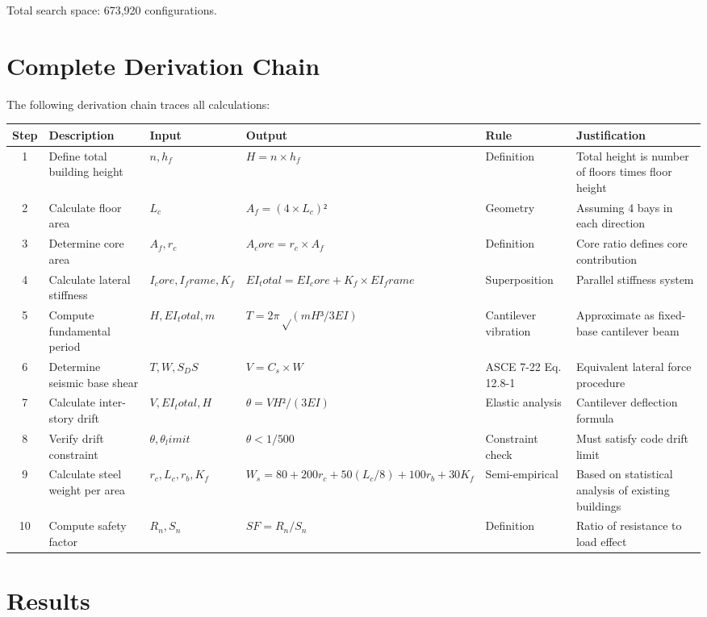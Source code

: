 \documentclass[11pt,a4paper]{article}
\begin{document}
Total search space: 673,920 configurations.

\section{Complete Derivation Chain}

The following derivation chain traces all calculations:

\begin{longtable}{|c|p{3cm}|p{2.5cm}|p{3cm}|p{2cm}|p{3cm}|}
\hline
Step & Description & Input & Output & Rule & Justification \\
\hline\endhead
1 & Define total building height & $n, h_f$ & $H = n × h_f$ & Definition & Total height is number of floors times floor height \\
\hline
2 & Calculate floor area & $L_c$ & $A_f = (4 × L_c)²$ & Geometry & Assuming 4 bays in each direction \\
\hline
3 & Determine core area & $A_f, r_c$ & $A_core = r_c × A_f$ & Definition & Core ratio defines core contribution \\
\hline
4 & Calculate lateral stiffness & $I_core, I_frame, K_f$ & $EI_total = EI_core + K_f × EI_frame$ & Superposition & Parallel stiffness system \\
\hline
5 & Compute fundamental period & $H, EI_total, m$ & $T = 2π√(mH³/3EI)$ & Cantilever vibration & Approximate as fixed-base cantilever beam \\
\hline
6 & Determine seismic base shear & $T, W, S_DS$ & $V = C_s × W$ & ASCE 7-22 Eq. 12.8-1 & Equivalent lateral force procedure \\
\hline
7 & Calculate inter-story drift & $V, EI_total, H$ & $θ = VH²/(3EI)$ & Elastic analysis & Cantilever deflection formula \\
\hline
8 & Verify drift constraint & $θ, θ_limit$ & $θ < 1/500$ & Constraint check & Must satisfy code drift limit \\
\hline
9 & Calculate steel weight per area & $r_c, L_c, r_b, K_f$ & $W_s = 80 + 200r_c + 50(L_c/8) + 100r_b + 30K_f$ & Semi-empirical & Based on statistical analysis of existing buildings \\
\hline
10 & Compute safety factor & $R_n, S_n$ & $SF = R_n/S_n$ & Definition & Ratio of resistance to load effect \\
\hline
\end{longtable}

\section{Results}
\end{document}
